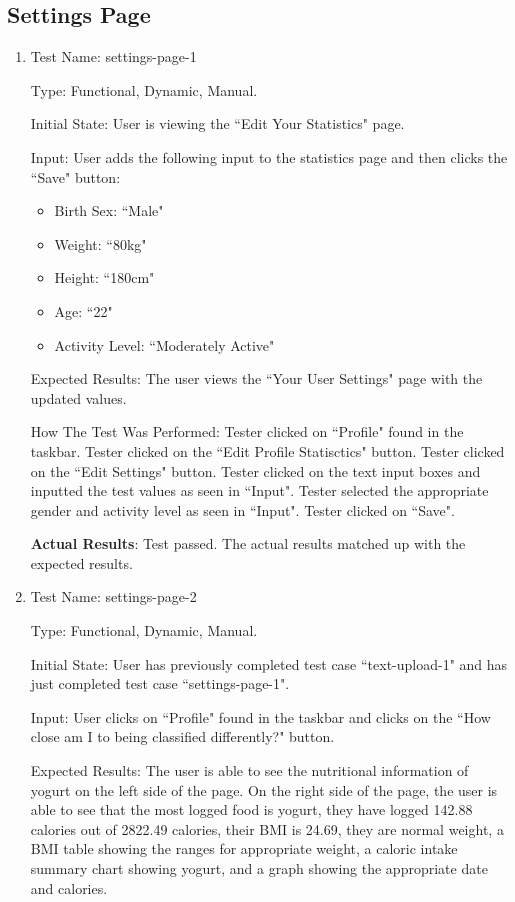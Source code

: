 \documentclass[12pt, titlepage]{article}
\begin{document}
	\subsection{Settings Page}
	\begin{enumerate}
		\item{Test Name: settings-page-1}
		
		Type: Functional, Dynamic, Manual.
		
		Initial State: User is viewing the ``Edit Your Statistics" page.
		
		Input: User adds the following input to the statistics page and then clicks the ``Save" button:
		
	\begin{itemize}
		\item Birth Sex: ``Male"
		\item Weight: ``80kg"
		\item Height: ``180cm"
		\item Age: ``22"
		\item Activity Level: ``Moderately Active"
	\end{itemize}
		
		Expected Results: The user views the ``Your User Settings" page with the updated values.
		
		How The Test Was Performed: Tester clicked on ``Profile" found in the taskbar. Tester clicked on the ``Edit Profile Statisctics" button. Tester clicked on the ``Edit Settings" button. Tester clicked on the text input boxes and inputted the test values as seen in ``Input". Tester selected the appropriate gender and activity level as seen in ``Input". Tester clicked on ``Save".
		
		\textbf{Actual Results}: Test passed. The actual results matched up with the expected results.
		
		\item{Test Name: settings-page-2}
		
		Type: Functional, Dynamic, Manual.
		
		Initial State: User has previously completed test case ``text-upload-1" and has just completed test case ``settings-page-1".
		
		Input: User clicks on ``Profile" found in the taskbar and clicks on the ``How close am I to being classified differently?" button.
		
		Expected Results: The user is able to see the nutritional information of yogurt on the left side of the page. On the right side of the page, the user is able to see that the most logged food is yogurt, they have logged 142.88 calories out of 2822.49 calories, their BMI is 24.69, they are normal weight, a BMI table showing the ranges for appropriate weight, a caloric intake summary chart showing yogurt, and a graph showing the appropriate date and calories.
		

\end{enumerate}
\end{document}
